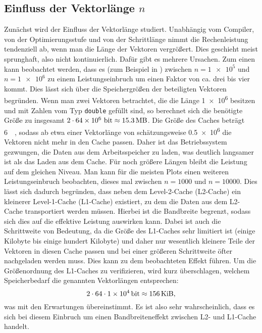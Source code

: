 \subsection{Einfluss der Vektorlänge $n$}
Zunächst wird der Einfluss der Vektorlänge studiert. Unabhängig vom Compiler, von
der Optimierungsstufe und von der Schrittlänge nimmt die Rechenleistung tendenziell
ab, wenn man die Länge der Vektoren vergrößert. Dies geschieht meist sprunghaft,
also nicht kontinuierlich. Dafür gibt es mehrere Ursachen. Zum einen kann beobachtet
werden, dass es (zum Beispiel in ) zwischen $n=\num{1e5}$ und
$n=\num{1e6}$ zu einem Leistungseinbruch um einen Faktor von ca. drei bis vier kommt.
Dies lässt sich über die Speichergrößen der beteiligten Vektoren begründen. Wenn 
man zwei Vektoren betrachtet, die die Länge \num{1e6} besitzen und mit Zahlen vom Typ
\texttt{double} gefüllt sind, so berechnet sich die benötigte Größe zu insgesamt
$2\cdot \num{64e6}\mbox{~bit}\approx \SI{15.3}{\mega\byte}$. Die Größe des Caches 
beträgt \SI{6}{\mega\byte}, sodass ab etwa einer Vektorlänge von schätzungsweise \num{0.5e6}     die 
Vektoren nicht mehr in den Cache passen. Daher ist das Betriebssystem gezwungen,
die Daten aus dem Arbeitsspeicher zu laden, was deutlich langsamer ist als das Laden
aus dem Cache. Für noch größere Längen bleibt die Leistung auf dem gleichen Niveau.
Man kann für die meisten Plots einen weiteren Leistungseinbruch beobachten, dieses
mal zwischen $n=1000$ und $n=10000$. Dies lässt sich dadurch begründen, dass neben
dem Level-2-Cache (L2-Cache) ein kleinerer Level-1-Cache (L1-Cache) existiert, zu
dem die Daten aus dem L2-Cache transportiert werden müssen. Hierbei ist die Bandbreite
begrenzt, sodass sich dies auf die effektive Leistung auswirken kann. Dabei ist auch
die Schrittweite von Bedeutung, da die Größe des L1-Caches sehr limitiert ist (einige
Kilobyte bis einige hundert Kilobyte) und daher nur wesentlich kleinere Teile der
Vektoren in diesen Cache passen und bei einer größeren Schrittweite öfter nachgeladen
werden muss. Dies kann zu dem beobachteten Effekt führen. Um die Größenordnung des
L1-Caches zu verifizieren, wird kurz überschlagen, welchem Speicherbedarf die
genannten Vektorlängen entsprechen: $$2\cdot64\cdot \SI{1e4}{\bit} \approx 
\SI{156}{\kibi\byte},$$ was mit den Erwartungen übereinstimmt. Es ist also sehr
wahrscheinlich, dass es sich bei diesem Einbruch um einen Bandbreiteneffekt zwischen
L2- und L1-Cache handelt.






